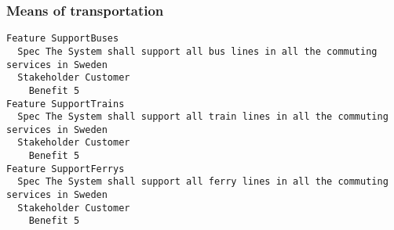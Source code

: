         
       \subsubsection{Means of transportation}


\begin{lstlisting}
Feature SupportBuses
  Spec The System shall support all bus lines in all the commuting services in Sweden
  Stakeholder Customer
    Benefit 5
Feature SupportTrains
  Spec The System shall support all train lines in all the commuting services in Sweden
  Stakeholder Customer
    Benefit 5
Feature SupportFerrys
  Spec The System shall support all ferry lines in all the commuting services in Sweden
  Stakeholder Customer
    Benefit 5

\end{lstlisting}